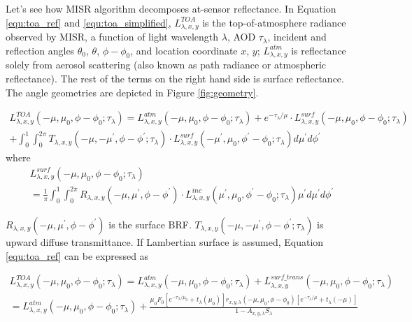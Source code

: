 Let's see how MISR algorithm decomposes at-sensor reflectance. In Equation \eqref{equ:toa_ref} and \eqref{equ:toa_simplified}, $L^{TOA}_{\lambda,x,y}$ is the top-of-atmosphere radiance observed by MISR, a function of light wavelength $\lambda$, AOD $\tau_\lambda$, incident and reflection angles $\theta_0$, $\theta$, $\phi-\phi_0$, and location coordinate $x$, $y$; $L^{atm}_{\lambda,x,y}$ is reflectance solely from aerosol scattering (also known as path radiance or atmospheric reflectance). The rest of the terms on the right hand side is surface reflectance. The angle geometries are depicted in Figure \ref{fig:geometry}.

\begin{multline} 
\label{equ:toa_ref}
L^{TOA}_{\lambda,x,y}(-\mu,\mu_0,\phi-\phi_0;\tau_\lambda)
= L^{atm}_{\lambda,x,y}(-\mu,\mu_0,\phi-\phi_0;\tau_\lambda) + e^{-\tau_\lambda/\mu} \cdot L^{surf}_{\lambda,x,y}(-\mu,\mu_0,\phi-\phi_0;\tau_\lambda) \\ 
+ \int_{0}^{1}\int_{0}^{2\pi}T_{\lambda,x,y}(-\mu,-\mu^\prime,\phi-\phi^\prime;\tau_\lambda) \cdot L^{surf}_{\lambda,x,y}(-\mu^\prime,\mu_0,\phi^\prime-\phi_0;\tau_\lambda)d\mu^\prime d\phi^\prime
\end{multline}
where
\begin{multline*}
L^{surf}_{\lambda,x,y}(-\mu,\mu_0,\phi-\phi_0;\tau_\lambda) \\
= \frac{1}{\pi}\int_{0}^{1}\int_{0}^{2\pi} R_{\lambda,x,y}(-\mu,\mu^\prime,\phi-\phi^\prime)\cdot L^{inc}_{\lambda,x,y}(\mu^\prime,\mu_0,\phi^\prime-\phi_0;\tau_\lambda)\mu^\prime d\mu^\prime d\phi^\prime 
\end{multline*}

$ R_{\lambda,x,y}(-\mu,\mu^\prime,\phi-\phi^\prime)$  is the surface BRF. $T_{\lambda,x,y}(-\mu,-\mu^\prime,\phi-\phi^\prime;\tau_\lambda)$ is upward diffuse transmittance. If Lambertian surface is assumed, Equation \eqref{equ:toa_ref} can be expressed as

\begin{multline}
\label{equ:toa_simplified}
L^{TOA}_{\lambda,x,y}(-\mu,\mu_0,\phi-\phi_0;\tau_\lambda) = L^{atm}_{\lambda,x,y}(-\mu,\mu_0,\phi-\phi_0;\tau_\lambda) + L^{surf\_trans}_{\lambda,x,y}(-\mu,\mu_0,\phi-\phi_0;\tau_\lambda) \\ =
L^{atm}_{\lambda,x,y}(-\mu,\mu_0,\phi-\phi_0;\tau_\lambda) + \frac{ \mu_0 F_0 \left[ e^{-\tau_\lambda/\mu_0} + t_\lambda(\mu_0)  \right] r_{x,y,\lambda} (-\mu,\mu_0,\phi-\phi_0) \left[ e^{-\tau_\lambda/\mu} + t_\lambda(-\mu)  \right] } { 1-A_{x,y,\lambda} S_\lambda }
\end{multline}

